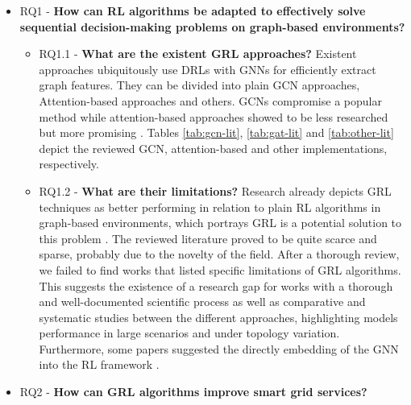 \begin{itemize}
	\item RQ1 - \textbf{How can \ac{RL} algorithms be adapted to effectively solve sequential decision-making problems on graph-based environments?} 
	\begin{itemize}
		\item RQ1.1 - \textbf{What are the existent \ac{GRL} approaches?}
		 Existent approaches ubiquitously use \acp{DRL} with \acp{GNN} for efficiently extract graph features. They can be divided into plain \ac{GCN} approaches, Attention-based approaches and others. \acp{GCN} compromise a popular method while attention-based approaches showed to be less researched but more promising \cite{xingRealtimeOptimalScheduling2023, zhaoLearningSequentialDistribution2022}. Tables \ref{tab:gcn-lit}, \ref{tab:gat-lit} and \ref{tab:other-lit} depict the reviewed \ac{GCN}, attention-based and other implementations, respectively. \\
		\item RQ1.2 - \textbf{What are their limitations?}
		 Research already depicts \ac{GRL} techniques as better performing in relation to plain \ac{RL} algorithms in graph-based environments, which portrays \ac{GRL} is a potential solution to this problem \cite{chenScalableGraphReinforcement2023, liNovelGraphReinforcement2022, zhaoGraphbasedDeepReinforcement2022b, xingBilevelGraphReinforcement2023, xingGraphReinforcementLearningBased2023, xuSimulationConstraintGraphReinforcement2020}. The reviewed literature proved to be quite scarce and sparse, probably due to the novelty of the field. After a thorough review, we failed to find works that listed specific limitations of \ac{GRL} algorithms. This suggests the existence of a research gap for works with a thorough and well-documented scientific process as well as comparative and systematic studies between the different approaches, highlighting models performance in large scenarios and under topology variation. Furthermore, some papers suggested the directly embedding of the \ac{GNN} into the \ac{RL} framework \cite{xingRealtimeOptimalScheduling2023, xingBilevelGraphReinforcement2023}. \\
	\end{itemize}
	\item RQ2 - \textbf{How can \ac{GRL} algorithms improve smart grid services?}
	\begin{itemize}

\end{itemize}
\end{itemize}
